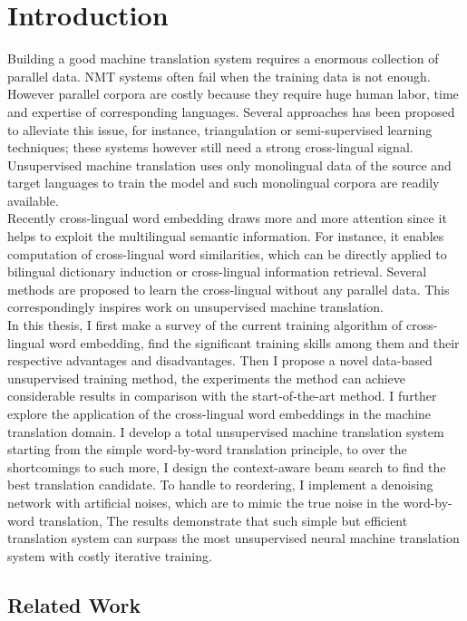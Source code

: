 
\chapter{Introduction}
Building a good machine translation system requires a enormous collection of parallel data. NMT systems often fail when the training data is not enough.  However parallel corpora are costly because they require huge human labor, time and expertise of corresponding languages.
\indent Several approaches has been proposed to alleviate this issue, for instance, triangulation or semi-supervised learning techniques; these systems however still need a strong cross-lingual signal. Unsupervised machine translation uses only monolingual data of the source and target languages to train the model and such monolingual corpora are readily available.\\
Recently cross-lingual word embedding draws more and more attention since it helps to exploit the multilingual semantic information. For instance, it enables computation of cross-lingual word similarities, which  can be directly applied to bilingual dictionary induction or cross-lingual information retrieval. Several methods are proposed to learn the cross-lingual without any parallel data. This correspondingly inspires work on unsupervised machine translation.\\
In this thesis, I first make a survey of the current training algorithm of cross-lingual word embedding, find the significant training skills among them and their respective advantages and disadvantages. Then I propose a novel data-based unsupervised training method, the experiments the method can achieve considerable results  in comparison with the start-of-the-art method. I further explore the 
application of the cross-lingual word embeddings in the machine translation domain.
I develop a total unsupervised machine translation system starting from the simple word-by-word translation principle, to over the shortcomings to such more, I design the context-aware beam search to find the best translation candidate. To handle to reordering, I implement a denoising network with artificial noises, which are to mimic the true noise in the word-by-word translation, The results demonstrate that such simple but efficient translation system can surpass the most unsupervised neural machine translation system with costly iterative training.


\section{Related Work}

